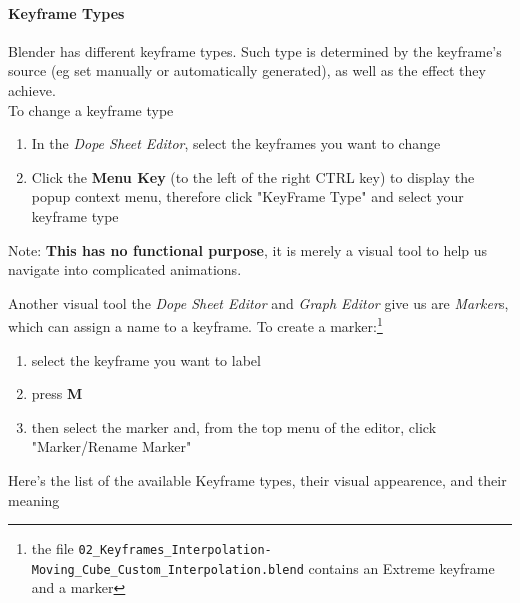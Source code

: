 \documentclass{article}
\begin{document}
\paragraph{Keyframe Types}
Blender has different keyframe types. Such type is determined by the keyframe's source (eg set manually or automatically generated), as well as the effect they achieve.\\
To change a keyframe type
\begin{enumerate}[noitemsep, topsep=0pt]
    \item In the \textit{Dope Sheet Editor}, select the keyframes you want to change
    \item Click the \textbf{Menu Key} (to the left of the right CTRL key) to display the popup context menu, therefore click "KeyFrame Type" and select your keyframe type
\end{enumerate}
Note: \textbf{This has no functional purpose}, it is merely a visual tool to help us navigate into complicated animations.\par
Another visual tool the \textit{Dope Sheet Editor} and \textit{Graph Editor} give us are \textit{Marker}s, which can assign a name to a keyframe. To create a marker:\footnote{the file
    \mbox{\texttt{02\_Keyframes\_Interpolation-Moving\_Cube\_Custom\_Interpolation.blend}} contains an Extreme keyframe and a marker}
\begin{enumerate}[noitemsep, topsep=0pt]
    \item select the keyframe you want to label
    \item press \textbf{M}
    \item then select the marker and, from the top menu of the editor, click "Marker/Rename Marker"
\end{enumerate}
Here's the list of the available Keyframe types, their visual appearence, and their meaning
\end{document}
